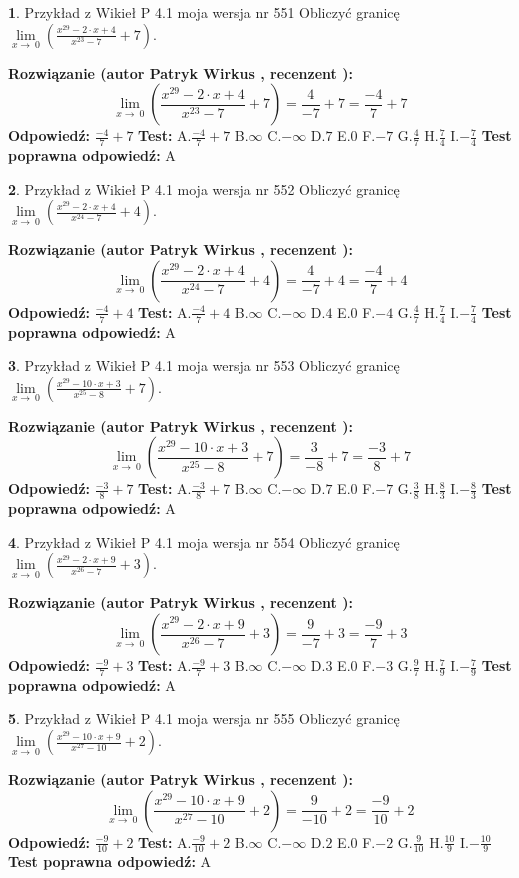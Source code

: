\documentclass[12pt, a4paper]{article}
\theoremstyle{definition} %
\newtheorem{zad}{}
\newcommand{\zadStart}[1]{\begin{zad}#1\newline}
\newcommand{\zadStop}{\end{zad}}
\newcommand{\rozwStart}[2]{\noindent \textbf{Rozwiązanie (autor #1 , recenzent #2): }\newline}
\newcommand{\rozwStop}{\newline}
\newcommand{\odpStart}{\noindent \textbf{Odpowiedź:}\newline}
\newcommand{\odpStop}{\newline}
\newcommand{\testStart}{\noindent \textbf{Test:}\newline}
\newcommand{\testStop}{\newline}
\newcommand{\kluczStart}{\noindent \textbf{Test poprawna odpowiedź:}\newline}
\newcommand{\kluczStop}{\newline}
\begin{document}
\zadStart{Przykład z Wikieł P 4.1 moja wersja nr 551}
Obliczyć granicę $\lim\limits_{x\to\ 0}(\frac{x^{29}-2 \cdot x +4}{x^{23}-7}+7)$.
\zadStop
\rozwStart{Patryk Wirkus}{}
$$\lim\limits_{x\to\ 0}(\frac{x^{29}-2 \cdot x +4}{x^{23}-7}+7)=\frac{4}{-7}+7=\frac{-4}{7}+7$$
\rozwStop
\odpStart
$\frac{-4}{7}+7$
\odpStop
\testStart
A.$\frac{-4}{7}+7$
B.$\infty$
C.$-\infty$
D.$7$
E.$0$
F.$-7$
G.$\frac{4}{7}$
H.$\frac{7}{4}$
I.$-\frac{7}{4}$
\testStop
\kluczStart
A
\kluczStop



\zadStart{Przykład z Wikieł P 4.1 moja wersja nr 552}
Obliczyć granicę $\lim\limits_{x\to\ 0}(\frac{x^{29}-2 \cdot x +4}{x^{24}-7}+4)$.
\zadStop
\rozwStart{Patryk Wirkus}{}
$$\lim\limits_{x\to\ 0}(\frac{x^{29}-2 \cdot x +4}{x^{24}-7}+4)=\frac{4}{-7}+4=\frac{-4}{7}+4$$
\rozwStop
\odpStart
$\frac{-4}{7}+4$
\odpStop
\testStart
A.$\frac{-4}{7}+4$
B.$\infty$
C.$-\infty$
D.$4$
E.$0$
F.$-4$
G.$\frac{4}{7}$
H.$\frac{7}{4}$
I.$-\frac{7}{4}$
\testStop
\kluczStart
A
\kluczStop



\zadStart{Przykład z Wikieł P 4.1 moja wersja nr 553}
Obliczyć granicę $\lim\limits_{x\to\ 0}(\frac{x^{29}-10 \cdot x +3}{x^{25}-8}+7)$.
\zadStop
\rozwStart{Patryk Wirkus}{}
$$\lim\limits_{x\to\ 0}(\frac{x^{29}-10 \cdot x +3}{x^{25}-8}+7)=\frac{3}{-8}+7=\frac{-3}{8}+7$$
\rozwStop
\odpStart
$\frac{-3}{8}+7$
\odpStop
\testStart
A.$\frac{-3}{8}+7$
B.$\infty$
C.$-\infty$
D.$7$
E.$0$
F.$-7$
G.$\frac{3}{8}$
H.$\frac{8}{3}$
I.$-\frac{8}{3}$
\testStop
\kluczStart
A
\kluczStop



\zadStart{Przykład z Wikieł P 4.1 moja wersja nr 554}
Obliczyć granicę $\lim\limits_{x\to\ 0}(\frac{x^{29}-2 \cdot x +9}{x^{26}-7}+3)$.
\zadStop
\rozwStart{Patryk Wirkus}{}
$$\lim\limits_{x\to\ 0}(\frac{x^{29}-2 \cdot x +9}{x^{26}-7}+3)=\frac{9}{-7}+3=\frac{-9}{7}+3$$
\rozwStop
\odpStart
$\frac{-9}{7}+3$
\odpStop
\testStart
A.$\frac{-9}{7}+3$
B.$\infty$
C.$-\infty$
D.$3$
E.$0$
F.$-3$
G.$\frac{9}{7}$
H.$\frac{7}{9}$
I.$-\frac{7}{9}$
\testStop
\kluczStart
A
\kluczStop



\zadStart{Przykład z Wikieł P 4.1 moja wersja nr 555}
Obliczyć granicę $\lim\limits_{x\to\ 0}(\frac{x^{29}-10 \cdot x +9}{x^{27}-10}+2)$.
\zadStop
\rozwStart{Patryk Wirkus}{}
$$\lim\limits_{x\to\ 0}(\frac{x^{29}-10 \cdot x +9}{x^{27}-10}+2)=\frac{9}{-10}+2=\frac{-9}{10}+2$$
\rozwStop
\odpStart
$\frac{-9}{10}+2$
\odpStop
\testStart
A.$\frac{-9}{10}+2$
B.$\infty$
C.$-\infty$
D.$2$
E.$0$
F.$-2$
G.$\frac{9}{10}$
H.$\frac{10}{9}$
I.$-\frac{10}{9}$
\testStop
\kluczStart
A
\kluczStop
\end{document}
